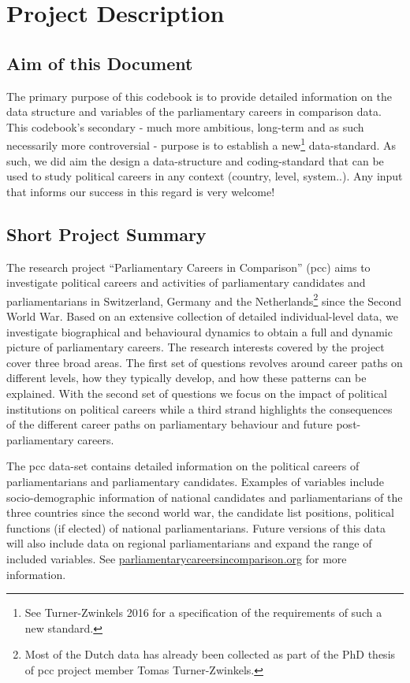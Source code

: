 \documentclass{article}
\begin{document}

\newpage
\tableofcontents

\newpage
{}
\listoftables
\newpage

\section{Project Description}
\subsection{Aim of this Document}
The primary purpose of this codebook is to provide detailed information on the data structure and variables of the parliamentary careers in comparison data. This codebook's secondary - much more ambitious, long-term and as such necessarily more controversial - purpose is to establish a new\footnote{See Turner-Zwinkels 2016 for a specification of the requirements of such a new standard.} data-standard. As such, we did aim the design a data-structure and coding-standard that can be used to study political careers in any context (country, level, system..). Any input that informs our success in this regard is very welcome!

\subsection{Short Project Summary}
The research project ``Parliamentary Careers in Comparison'' (\gls{pcc}) aims to investigate political careers and activities of parliamentary candidates and parliamentarians in Switzerland, Germany and the Netherlands\footnote{Most of the Dutch data has already been collected as part of the PhD thesis of \gls{pcc} project member Tomas Turner-Zwinkels.} since the Second World War. Based on an extensive collection of detailed individual-level data, we investigate biographical and behavioural dynamics to obtain a full and dynamic picture of parliamentary careers. The research interests covered by the project cover three broad areas. The first set of questions revolves around career paths on different levels, how they typically develop, and how these patterns can be explained. With the second set of questions we focus on the impact of political institutions on political careers while a third strand highlights the consequences of the different career paths on parliamentary behaviour and future post-parliamentary careers.\par
The \gls{pcc} data-set contains detailed information on the political careers of parliamentarians and parliamentary candidates. Examples of variables include socio-demographic information of national candidates and parliamentarians of the three countries since the second world war, the candidate list positions, political functions (if elected) of national parliamentarians. Future versions of this data will also include data on regional parliamentarians and expand the range of included variables. See \url{parliamentarycareersincomparison.org} for more information.
\end{document}
